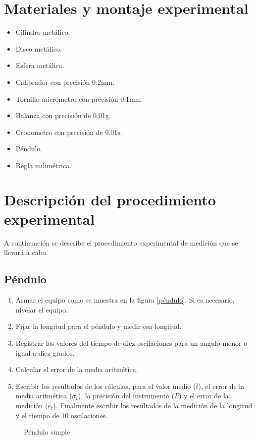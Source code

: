 \documentclass[letter,twoside,11pt]{article}
\begin{document}
\section{Materiales y montaje experimental}
\begin{itemize}
\item Cilindro metálico.
\item Disco metálico.
\item Esfera metálica.
\item Calibrador con precisión 0.2mm.
\item Tornillo micrómetro con precisión 0.1mm.
\item Balanza con precisión de 0.01g.
\item Cronometro con precisión de 0.01s.
\item Péndulo.
\item Regla milimétrica.
\end{itemize}

\section{Descripción del procedimiento experimental}
A continuación se describe el procedimiento experimental de medición que se
llevará a cabo.

\subsection{Péndulo}
\begin{enumerate}
\item Armar el equipo como se muestra en la figura \ref{péndulo}. Si es
necesario, nivelar el equipo.
\item Fijar la longitud para el péndulo y medir esa longitud.
\item Registrar los valores del tiempo de diez oscilaciones para un angulo menor
o igual a diez grados.
\item Calcular el error de la media aritmética.
\item Escribir los resultados de los cálculos, para el valor medio ($\bar{t}$),
el error de la media aritmética ($\sigma_t$), la precisión del instrumento ($P$)
y el error de la medición ($e_t$). Finalmente escribir los resultados de la
medición de la longitud y el tiempo de 10 oscilaciones.
\end{enumerate}

\begin{figure}
\centering

\caption{Péndulo simple}
\label{pendulo}
\end{figure}
\end{document}
